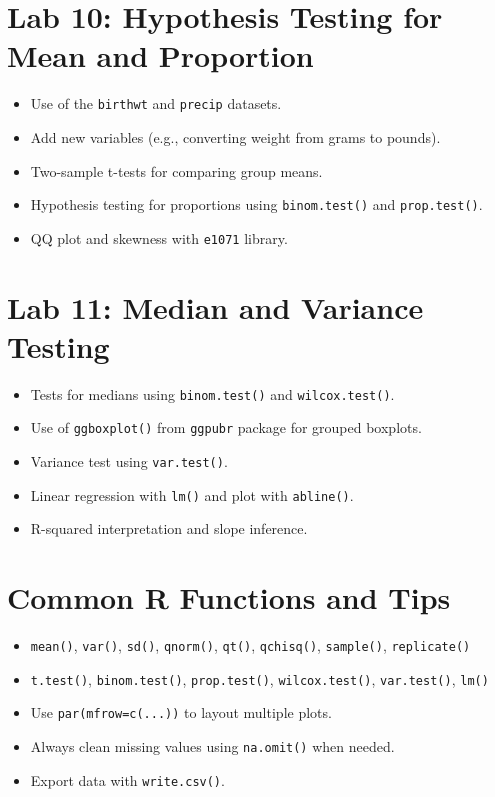 \documentclass{article}
\begin{document}
\section*{Lab 10: Hypothesis Testing for Mean and Proportion}
\begin{itemize}
  \item Use of the \texttt{birthwt} and \texttt{precip} datasets.
  \item Add new variables (e.g., converting weight from grams to pounds).
  \item Two-sample t-tests for comparing group means.
  \item Hypothesis testing for proportions using \texttt{binom.test()} and \texttt{prop.test()}.
  \item QQ plot and skewness with \texttt{e1071} library.
\end{itemize}

\section*{Lab 11: Median and Variance Testing}
\begin{itemize}
  \item Tests for medians using \texttt{binom.test()} and \texttt{wilcox.test()}.
  \item Use of \texttt{ggboxplot()} from \texttt{ggpubr} package for grouped boxplots.
  \item Variance test using \texttt{var.test()}.
  \item Linear regression with \texttt{lm()} and plot with \texttt{abline()}.
  \item R-squared interpretation and slope inference.
\end{itemize}

\section*{Common R Functions and Tips}
\begin{itemize}
  \item \texttt{mean()}, \texttt{var()}, \texttt{sd()}, \texttt{qnorm()}, \texttt{qt()}, \texttt{qchisq()}, \texttt{sample()}, \texttt{replicate()}
  \item \texttt{t.test()}, \texttt{binom.test()}, \texttt{prop.test()}, \texttt{wilcox.test()}, \texttt{var.test()}, \texttt{lm()}
  \item Use \texttt{par(mfrow=c(...))} to layout multiple plots.
  \item Always clean missing values using \texttt{na.omit()} when needed.
  \item Export data with \texttt{write.csv()}.
\end{itemize}
\end{document}
